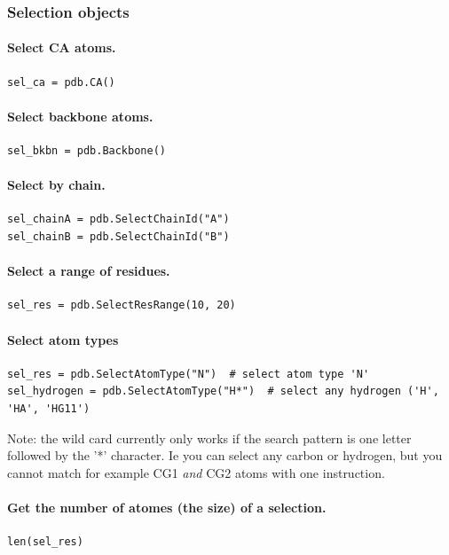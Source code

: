 \documentclass[12pt,a4paper]{article}
\begin{document}
\subsubsection{Selection objects}
\paragraph{Select CA atoms.}
\begin{verbatim}
sel_ca = pdb.CA()
\end{verbatim}

\paragraph{Select backbone atoms.}
\begin{verbatim}
sel_bkbn = pdb.Backbone()
\end{verbatim}

\paragraph{Select by chain.}
\begin{verbatim}
sel_chainA = pdb.SelectChainId("A")
sel_chainB = pdb.SelectChainId("B")
\end{verbatim}

\paragraph{Select a range of residues.}
\begin{verbatim}
sel_res = pdb.SelectResRange(10, 20)
\end{verbatim}

\paragraph{Select atom types}
\begin{verbatim}
sel_res = pdb.SelectAtomType("N")  # select atom type 'N'
sel_hydrogen = pdb.SelectAtomType("H*")  # select any hydrogen ('H', 'HA', 'HG11')
\end{verbatim}

Note: the wild card currently only works if the search pattern is one letter followed by the '*' character. 
Ie you can select any carbon or hydrogen, but you cannot match for example CG1 \emph{and} CG2 atoms with one instruction.

\paragraph{Get the number of atomes (the size) of a selection.}
\begin{verbatim}
len(sel_res)
\end{verbatim}
\end{document}
